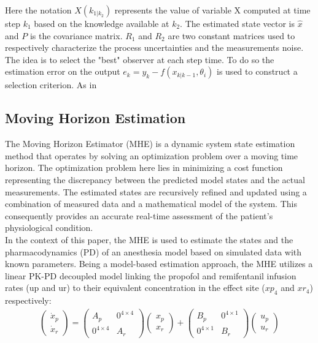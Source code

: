 Here the notation $X(k_{1|k_2})$ represents the value of variable X computed at time step $k_1$ based on the knowledge available at $k_2$. The estimated state vector is $\hat{x}$ and $P$ is the covariance matrix. $R_1$ and $R_2$ are two constant matrices used to respectively characterize the process uncertainties and the measurements noise.\\


The idea is to select the "best" observer at each step time. To do so the estimation error on the output $e_k = y_k - f(x_{k|k-1}, \theta_i)$ is used to construct a selection criterion. As in \cite{petriImprovingEstimationPerformance2022}


\subsection{Moving Horizon Estimation}
The Moving Horizon Estimator (MHE) is a dynamic system state estimation method that operates by solving an optimization problem over a moving time horizon. The optimization problem here lies in minimizing a cost function representing the discrepancy between the predicted model states and the actual measurements. The estimated states are recursively refined and updated using a combination of measured data and a mathematical model of the system. This consequently provides an accurate real-time assessment of the patient's physiological condition.\\

In the context of this paper, the MHE is used to estimate the states and the pharmacodynamics (PD) of an anesthesia model based on simulated data with known parameters. Being a model-based estimation approach, the MHE utilizes a linear PK-PD decoupled model linking the propofol and remifentanil infusion rates (up and ur) to their equivalent concentration in the effect site ($xp_4$ and $xr_4$) respectively:
\begin{align*}
\begin{pmatrix}\dot{x}_p \\ \dot{x}_r \end{pmatrix} =
\begin{pmatrix} A_p & 0^{4\times4 }\\0^{4\times 4} &  A_r \end{pmatrix}
\begin{pmatrix} x_p \\ x_r \end{pmatrix} + 
\begin{pmatrix} B_p & 0^{4 \times 1 } \\ 0^{4 \times 1 }  &   B_r \end{pmatrix}
\begin{pmatrix} u_p \\ u_r \end{pmatrix}
\end{align*}

